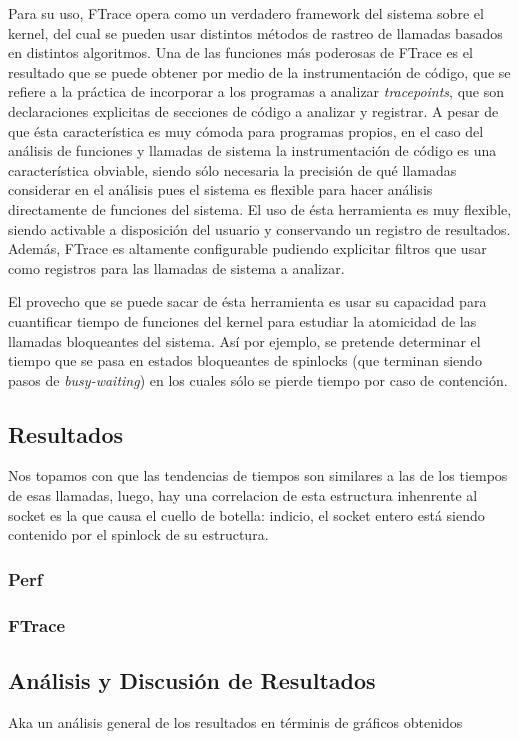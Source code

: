 Para su uso, FTrace opera como un verdadero framework del sistema sobre el kernel, del cual se pueden usar distintos métodos de rastreo de llamadas basados en distintos algoritmos. Una de las funciones más poderosas de FTrace es el resultado que se puede obtener por medio de la instrumentación de código, que se refiere a la práctica de incorporar a los programas a analizar \emph{tracepoints}, que son declaraciones explicitas de secciones de código a analizar y registrar. A pesar de que ésta característica es muy cómoda para programas propios, en el caso del análisis de funciones y llamadas de sistema la instrumentación de código es una característica obviable, siendo sólo necesaria la precisión de qué llamadas considerar en el análisis pues el sistema es flexible para hacer análisis directamente de funciones del sistema. El uso de ésta herramienta es muy flexible, siendo activable a disposición del usuario y conservando un registro de resultados. Además, FTrace es altamente configurable pudiendo explicitar filtros que usar como registros para las llamadas de sistema a analizar.

El provecho que se puede sacar de ésta herramienta es usar su capacidad para cuantificar tiempo de funciones del kernel para estudiar la atomicidad de las llamadas bloqueantes del sistema. Así por ejemplo, se pretende determinar el tiempo que se pasa en estados bloqueantes de spinlocks (que terminan siendo pasos de \emph{busy-waiting}) en los cuales sólo se pierde tiempo por caso de contención.


\subsection{Resultados}
Nos topamos con que las tendencias de tiempos son similares a las de los tiempos de esas llamadas, luego, hay una correlacion de esta estructura inhenrente al socket es la que causa el cuello de botella: indicio, el socket entero está siendo contenido por el spinlock de su estructura.

\subsubsection{Perf}
\subsubsection{FTrace}

\subsection{Análisis y Discusión de Resultados}
Aka un análisis general de los resultados en términis de gráficos obtenidos

